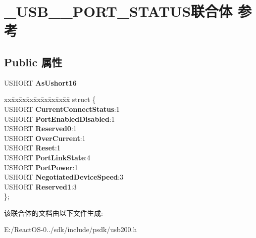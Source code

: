 \hypertarget{union___u_s_b__30___p_o_r_t___s_t_a_t_u_s}{}\section{\+\_\+\+U\+S\+B\+\_\+\_\+\+P\+O\+R\+T\+\_\+\+S\+T\+A\+T\+U\+S联合体 参考}
\label{union___u_s_b__30___p_o_r_t___s_t_a_t_u_s}
\subsection*{Public 属性}
\begin{DoxyCompactItemize}
\item 
\mbox{\label{union___u_s_b__30___p_o_r_t___s_t_a_t_u_s_a0d00057ba93b420caccb2fc56a487c0a}} 
U\+S\+H\+O\+RT {\bfseries As\+Ushort16}
\item 
\mbox{\label{union___u_s_b__30___p_o_r_t___s_t_a_t_u_s_ab58a98fd6a86ec5a55820242467304c3}} 
\begin{tabbing}
xx\=xx\=xx\=xx\=xx\=xx\=xx\=xx\=xx\=\kill
struct \{\\
\>USHORT {\bfseries CurrentConnectStatus}:1\\
\>USHORT {\bfseries PortEnabledDisabled}:1\\
\>USHORT {\bfseries Reserved0}:1\\
\>USHORT {\bfseries OverCurrent}:1\\
\>USHORT {\bfseries Reset}:1\\
\>USHORT {\bfseries PortLinkState}:4\\
\>USHORT {\bfseries PortPower}:1\\
\>USHORT {\bfseries NegotiatedDeviceSpeed}:3\\
\>USHORT {\bfseries Reserved1}:3\\
\}; \\

\end{tabbing}\end{DoxyCompactItemize}


该联合体的文档由以下文件生成\+:\begin{DoxyCompactItemize}
\item 
E\+:/\+React\+O\+S-\/0../sdk/include/psdk/usb200.\+h\end{DoxyCompactItemize}
